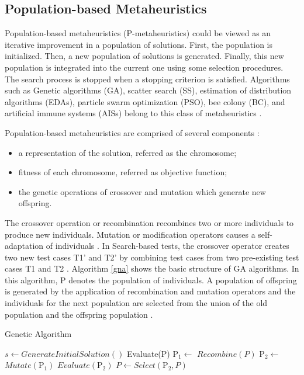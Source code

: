 \documentclass[espaco=umemeio,chapter=TITLE,twoside,openright]{abnt}
\begin{document}
\subsection{Population-based Metaheuristics}

Population-based metaheuristics (P-metaheuristics) could be viewed as an iterative improvement in a population of solutions. First, the population is initialized. Then, a new population of solutions is generated. Finally, this new population is integrated into the current one using some selection procedures. The search process is stopped when a stopping criterion is satisfied. Algorithms such as Genetic algorithms (GA), scatter search (SS), estimation of distribution algorithms (EDAs), particle swarm optimization (PSO), bee colony (BC), and artificial immune systems (AISs) belong to this class of metaheuristics \cite{talbi2009metaheuristics}.

Population-based metaheuristics are comprised of several components \cite{hong2000simultaneously} \cite{shousha2003performance} :

\begin{itemize}
\item a representation of the solution, referred as the chromosome;
\item fitness of each chromosome, referred as objective function;
\item the genetic operations of crossover and mutation which generate new offspring.
\end{itemize}

The crossover operation or recombination recombines two or more individuals to produce new individuals. Mutation or modification operators causes a self-adaptation of individuals \cite{Blum2003}. In Search-based tests, the crossover operator creates two new test cases T1' and T2' by combining test cases from two pre-existing test cases T1 and T2 \cite{Aleti2016}. Algorithm \ref{gna} shows the basic structure of GA algorithms. In this algorithm, P denotes the population of individuals. A population of offspring is generated by the application of recombination and mutation operators and the individuals for the next population are selected from the union of the old population and the offspring population \cite{raidl2010metaheuristic}.


\begin{algorithm}[h]
  \caption{Genetic Algorithm}\label{gna}
  \begin{algorithmic}[1]

    \State $s\gets GenerateInitialSolution()$
    \State Evaluate(P)
    \State $\mbox{P}_1\gets$ $Recombine(P)$
    \State $\mbox{P}_2\gets$ $Mutate(\mbox{P}_1)$
    \State $Evaluate(\mbox{P}_2)$
    \State $P\gets Select(\mbox{P}_2,P)$
    \EndWhile

  \end{algorithmic}
\end{algorithm}
\end{document}
